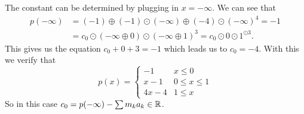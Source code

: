 \documentclass[12pt]{memoir}
\begin{document}
\begin{Ex}
\begin{table}[h!]
\begin{tabular}{rrrr}
   \bottomrule
    \end{tabular}
    \end{table}
    The constant can be determined by plugging in $x=-\infty$. We can see that 
    \begin{align*}
        p(-\infty)&=(-1)\oplus(-1)\odot (-\infty)\oplus(-4)\odot (-\infty)^4=-1\\
        &=c_0\odot(-\infty\oplus 0)\odot(-\infty\oplus 1)^3=c_0\odot0\odot 1^{\odot 3}.
    \end{align*}
    This gives us the equation $c_0+0+3=-1$ which leads us to $c_0=-4$. With this we verify that 
    $$p(x)=\begin{cases}
        -1&x\leq 0\\
        x-1&0\leq x\leq 1\\
        4x-4&1\leq x
    \end{cases}$$
    So in this case $c_0=p(-\infty)-\sum m_ka_k\in\mathbb{R}$.
\end{Ex}
\end{document}
